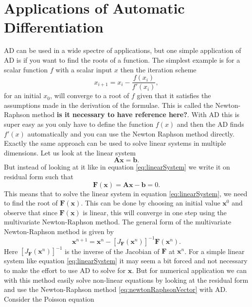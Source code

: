 \section{Applications of Automatic Differentiation}
AD can be used in a wide spectre of applications, but one simple application of AD is if you want to find the roots of a function. The simplest example is for a scalar function $f$ with a scalar input $x$ then the iteration scheme
\begin{equation*}
    x_{i+1} = x_i - \frac{f(x_i)}{f'(x_i)},
\end{equation*}
for an initial $x_0$, will converge to a root of $f$ given that it satisfies the assumptions made in the derivation of the formulae. This is called the Newton-Raphson method \textbf{is it necessary to have reference here?}. With AD this is super easy as you only have to define the function $f(x)$ and then the AD finds $f'(x)$ automatically and you can use the Newton Raphson method directly. Exactly the same approach can be used to solve linear systems in multiple dimensions. Let us look at the linear system 
\begin{equation}
    \textbf{A}\boldsymbol{x} = \textbf{b}.
    \label{eq:linearSystem}
\end{equation}
But instead of looking at it like in equation \eqref{eq:linearSystem} we write it on residual form such that
\begin{equation*}
	\boldsymbol{F}(\boldsymbol{x}) = \textbf{A}\boldsymbol{x} - \boldsymbol{b} = 0 .
\end{equation*}
This means that to solve the linear system in equation \eqref{eq:linearSystem}, we need to find the root of $\boldsymbol{F}(\boldsymbol{x})$. This can be done by choosing an initial value $\boldsymbol{x}^0$ and observe that since $\boldsymbol{F}(\boldsymbol{x})$ is linear, this will converge in one step using the multivariate Newton-Raphson method. The general form of the multivariate Newton-Raphson method is given by
\begin{equation}
	\boldsymbol{x}^{n+1} = \boldsymbol{x}^n - \left[J_{\boldsymbol{F}}  (\boldsymbol{x}^n)\right]^{-1} \boldsymbol{F}(\boldsymbol{x}^n).
    \label{eq:newtonRaphsonVector}
\end{equation}
Here $\left[J_{\boldsymbol{F}}  (\boldsymbol{x}^n)\right]^{-1}$ is the inverse of the Jacobian of $\boldsymbol{F}$ at $\boldsymbol{x}^n$. For a simple linear system like equation \eqref{eq:linearSystem} it may seem a bit forced and not necessary to make the effort to use AD to solve for $\boldsymbol{x}$. But for numerical application we can with this method easily solve non-linear equations by looking at the residual form and use the Newton-Raphson method \eqref{eq:newtonRaphsonVector} with AD. Consider the Poisson equation
